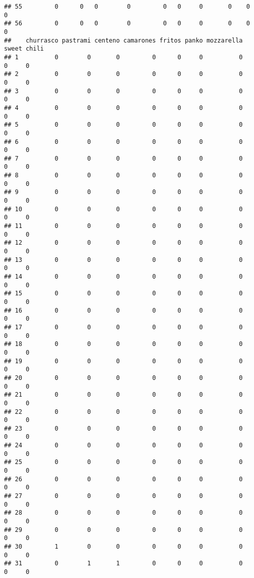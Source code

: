 \documentclass[
]{article}
\begin{document}
\begin{verbatim}
## 55         0      0   0        0         0   0     0       0    0     0
## 56         0      0   0        0         0   0     0       0    0     0
##    churrasco pastrami centeno camarones fritos panko mozzarella sweet chili
## 1          0        0       0         0      0     0          0     0     0
## 2          0        0       0         0      0     0          0     0     0
## 3          0        0       0         0      0     0          0     0     0
## 4          0        0       0         0      0     0          0     0     0
## 5          0        0       0         0      0     0          0     0     0
## 6          0        0       0         0      0     0          0     0     0
## 7          0        0       0         0      0     0          0     0     0
## 8          0        0       0         0      0     0          0     0     0
## 9          0        0       0         0      0     0          0     0     0
## 10         0        0       0         0      0     0          0     0     0
## 11         0        0       0         0      0     0          0     0     0
## 12         0        0       0         0      0     0          0     0     0
## 13         0        0       0         0      0     0          0     0     0
## 14         0        0       0         0      0     0          0     0     0
## 15         0        0       0         0      0     0          0     0     0
## 16         0        0       0         0      0     0          0     0     0
## 17         0        0       0         0      0     0          0     0     0
## 18         0        0       0         0      0     0          0     0     0
## 19         0        0       0         0      0     0          0     0     0
## 20         0        0       0         0      0     0          0     0     0
## 21         0        0       0         0      0     0          0     0     0
## 22         0        0       0         0      0     0          0     0     0
## 23         0        0       0         0      0     0          0     0     0
## 24         0        0       0         0      0     0          0     0     0
## 25         0        0       0         0      0     0          0     0     0
## 26         0        0       0         0      0     0          0     0     0
## 27         0        0       0         0      0     0          0     0     0
## 28         0        0       0         0      0     0          0     0     0
## 29         0        0       0         0      0     0          0     0     0
## 30         1        0       0         0      0     0          0     0     0
## 31         0        1       1         0      0     0          0     0     0

\end{verbatim}
\end{document}
